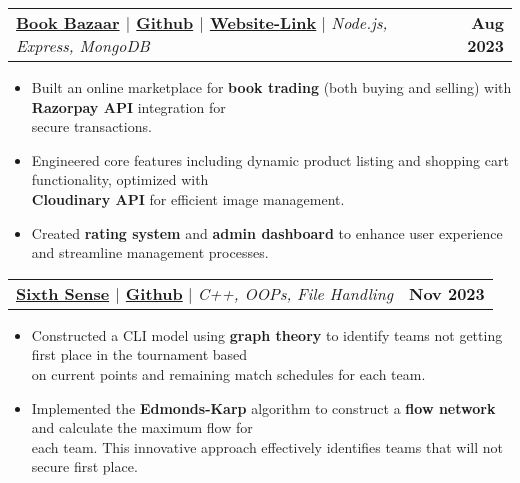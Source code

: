 \documentclass[letterpaper,11pt]{article}
\makeatletter
\newcommand{\resumeItem}[1]{
  \item\small{
    {#1 \vspace{-2pt}}
  }
}
\newcommand{\resumeProjectHeading}[2]{
    \item
    \begin{tabular*}{1.001\textwidth}{l@{\extracolsep{\fill}}r}
      \small#1 & \textbf{\small #2}\\
    \end{tabular*}\vspace{-7pt}
}
\newcommand{\resumeItemListStart}{\begin{itemize}}
\newcommand{\resumeItemListEnd}{\end{itemize}\vspace{-5pt}}
\makeatother
\begin{document}
\resumeProjectHeading
    {\textbf{\underline{Book Bazaar} $|$ \href{https://github.com/pragunb02/Final-proj}{Github} $|$ \href{https://bookbazaar-duqs.onrender.com/}{Website-Link}} $|$  \emph{Node.js, Express, MongoDB}}{Aug 2023}
\resumeItemListStart
    \vspace{3pt}
     \resumeItem{Built an online marketplace for \textbf{book trading} (both buying and selling) with \textbf{Razorpay API} integration for\\ secure transactions.}
    \vspace{3pt}
    \resumeItem{Engineered core features including dynamic product listing and shopping cart functionality, optimized with\\ \textbf{Cloudinary API} for efficient image management.}
    \vspace{3pt}
    \resumeItem{Created \textbf{rating system} and \textbf{admin dashboard} to enhance user experience and streamline management processes.}
\resumeItemListEnd
\vspace{-10pt}



\resumeProjectHeading
    {\textbf{\underline{Sixth Sense} $|$ \href{https://github.com/pragunb02/SixthSense}{Github}} $|$ \emph{C++, OOPs, File Handling}}{Nov 2023}
\resumeItemListStart
\vspace{4pt}
\resumeItem{Constructed a CLI model using \textbf{graph theory} to identify teams not getting first place in the tournament based\\ on current points and remaining match schedules for each team.}
\vspace{4pt}
\resumeItem{Implemented the \textbf{Edmonds-Karp} algorithm  to construct a \textbf{flow network} and calculate the maximum flow for\\ each team. This innovative approach effectively identifies teams that will not secure first place.}
\resumeItemListEnd
    \vspace{-10pt}



\end{document}
